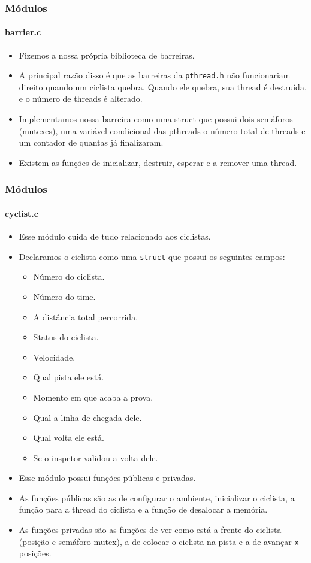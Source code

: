 \documentclass{beamer}
\begin{document}
\begin{frame}
	\frametitle{Módulos}
	\framesubtitle{barrier.c}
	\begin{itemize}
		\item Fizemos a nossa própria biblioteca de barreiras. 
		\item A principal razão disso é que as barreiras da \texttt{pthread.h} não funcionariam direito quando um ciclista quebra. Quando ele quebra, sua thread é destruída, e o número de threads é alterado.
		\item Implementamos nossa barreira como uma struct que possui dois semáforos (mutexes), uma variável condicional das pthreads o número total de threads e um contador de quantas já finalizaram.
		\item Existem as funções de inicializar, destruir, esperar e a remover uma thread.
	\end{itemize}
\end{frame}

\begin{frame}
	\frametitle{Módulos}
	\framesubtitle{cyclist.c}
	\begin{itemize}
		\item Esse módulo cuida de tudo relacionado aos ciclistas.
		\item Declaramos o ciclista como uma
		\texttt{struct} que possui os seguintes campos:
		\begin{itemize}
			\item Número do ciclista.
			\item Número do time.
			\item A distância total percorrida.
			\item Status do ciclista.         
			\item Velocidade.
			\item Qual pista ele está.
			\item Momento em que acaba a prova.
			\item Qual a linha de chegada dele.    
			\item Qual volta ele está.     
			\item Se o inspetor validou a volta dele.
		\end{itemize}
	\end{itemize}	
\end{frame}

\begin{frame}
	\begin{itemize}
		\item Esse módulo possui funções públicas e privadas.
		\item As funções públicas são as de configurar o ambiente, inicializar o ciclista, a função para a thread do ciclista e a função de desalocar a memória.
		\item As funções privadas são as funções de ver como está a frente do ciclista (posição e semáforo mutex), a de colocar o ciclista na pista e a de avançar \texttt{x} posições. 
	\end{itemize}
\end{frame}
\end{document}
